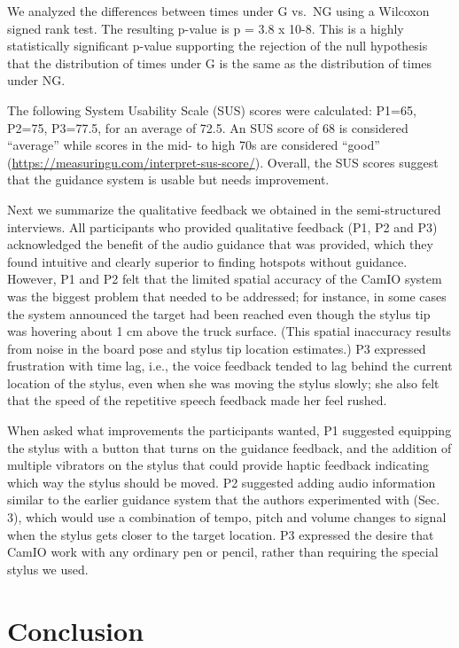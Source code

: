 \documentclass[runningheads]{res/templates/llncs}
\begin{document}
We analyzed the differences between times under G vs.~NG using a
Wilcoxon signed rank test. The resulting p-value is p = 3.8 x 10-8. This
is a highly statistically significant p-value supporting the rejection
of the null hypothesis that the distribution of times under G is the
same as the distribution of times under NG.

The following System Usability Scale (SUS) scores were calculated:
P1=65, P2=75, P3=77.5, for an average of 72.5. An SUS score of 68 is
considered ``average'' while scores in the mid- to high 70s are
considered ``good'' (\url{https://measuringu.com/interpret-sus-score/}).
Overall, the SUS scores suggest that the guidance system is usable but
needs improvement.

Next we summarize the qualitative feedback we obtained in the
semi-structured interviews. All participants who provided qualitative
feedback (P1, P2 and P3) acknowledged the benefit of the audio guidance
that was provided, which they found intuitive and clearly superior to
finding hotspots without guidance. However, P1 and P2 felt that the
limited spatial accuracy of the CamIO system was the biggest problem
that needed to be addressed; for instance, in some cases the system
announced the target had been reached even though the stylus tip was
hovering about 1 cm above the truck surface. (This spatial inaccuracy
results from noise in the board pose and stylus tip location estimates.)
P3 expressed frustration with time lag, i.e., the voice feedback tended
to lag behind the current location of the stylus, even when she was
moving the stylus slowly; she also felt that the speed of the repetitive
speech feedback made her feel rushed.

When asked what improvements the participants wanted, P1 suggested
equipping the stylus with a button that turns on the guidance feedback,
and the addition of multiple vibrators on the stylus that could provide
haptic feedback indicating which way the stylus should be moved. P2
suggested adding audio information similar to the earlier guidance
system that the authors experimented with (Sec. 3), which would use a
combination of tempo, pitch and volume changes to signal when the stylus
gets closer to the target location. P3 expressed the desire that CamIO
work with any ordinary pen or pencil, rather than requiring the special
stylus we used.

\hypertarget{conclusion}{%
\section{Conclusion}\label{conclusion}}
\end{document}
